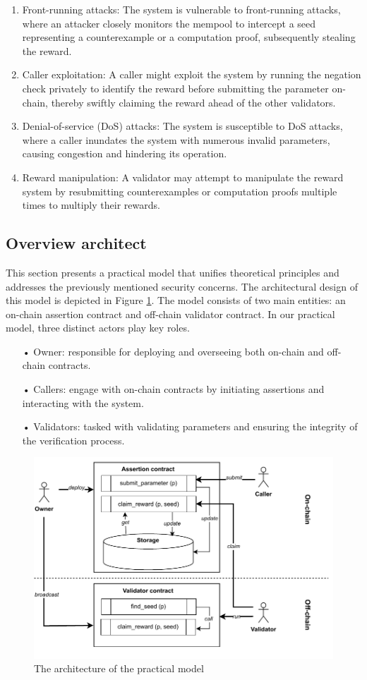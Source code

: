 \documentclass[runningheads]{llncs}
\begin{document}
\begin{enumerate}
\item Front-running attacks: The system is vulnerable to front-running attacks, where an attacker closely monitors the mempool to intercept a seed representing a counterexample or a computation proof, subsequently stealing the reward.
\item Caller exploitation: A caller might exploit the system by running the negation check privately to identify the reward before submitting the parameter on-chain, thereby swiftly claiming the reward ahead of the other validators. 
\item Denial-of-service (DoS) attacks: The system is susceptible to DoS attacks, where a caller inundates the system with numerous invalid parameters, causing congestion and hindering its operation.
\item Reward manipulation: A validator may attempt to manipulate the reward system by resubmitting counterexamples or computation proofs multiple times to multiply their rewards.
\end{enumerate}
\subsection{Overview architect}
This section presents a practical model that unifies theoretical principles and addresses the previously mentioned security concerns. The architectural design of this model is depicted in Figure \ref{fig.architect}. The model consists of two main entities: an on-chain assertion contract and off-chain validator contract. In our practical model, three distinct actors play key roles.
\begin{itemize}
\item[•] Owner: responsible for deploying and overseeing both on-chain and off-chain contracts.
\item[•] Callers: engage with on-chain contracts by initiating assertions and interacting with the system.
\item[•] Validators: tasked with validating parameters and ensuring the integrity of the verification process.
\end{itemize}


\begin{figure}
\centering
\includegraphics[scale=.8]{assertion}
\caption{The architecture of the practical model}
\label{fig.architect}
\end{figure}
\end{document}
